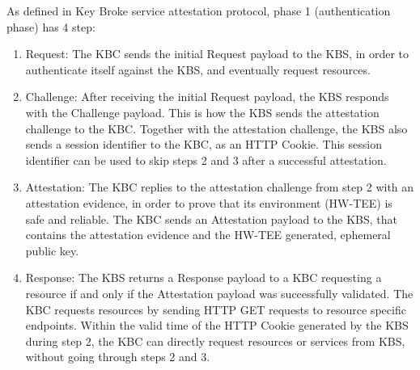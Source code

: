 As defined in Key Broke service attestation protocol, phase 1 (authentication phase) has 4 step: 
\begin{displayquote}
    \begin{enumerate}
        \item  Request: The KBC sends the initial Request payload to the KBS, in order to authenticate itself against the KBS, and eventually request resources.
        \item  Challenge: After receiving the initial Request payload, the KBS responds with the Challenge payload. This is how the KBS sends the attestation challenge to the KBC. Together with the attestation challenge, the KBS also sends a session identifier to the KBC, as an HTTP Cookie. This session identifier can be used to skip steps 2 and 3 after a successful attestation.
        \item  Attestation: The KBC replies to the attestation challenge from step 2 with an attestation evidence, in order to prove that its environment (HW-TEE) is safe and reliable. The KBC sends an Attestation payload to the KBS, that contains the attestation evidence and the HW-TEE generated, ephemeral public key.
        \item  Response: The KBS returns a Response payload to a KBC requesting a resource if and only if the Attestation payload was successfully validated. The KBC requests resources by sending HTTP GET requests to resource specific endpoints. Within the valid time of the HTTP Cookie generated by the KBS during step 2, the KBC can directly request resources or services from KBS, without going through steps 2 and 3.
    \end{enumerate}
\end{displayquote}


